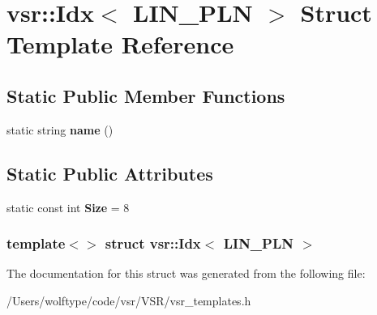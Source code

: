 \hypertarget{structvsr_1_1_idx_3_01_l_i_n___p_l_n_01_4}{\section{vsr\-:\-:Idx$<$ L\-I\-N\-\_\-\-P\-L\-N $>$ Struct Template Reference}
\label{structvsr_1_1_idx_3_01_l_i_n___p_l_n_01_4}
}
\subsection*{Static Public Member Functions}
\begin{DoxyCompactItemize}
\item 
\hypertarget{structvsr_1_1_idx_3_01_l_i_n___p_l_n_01_4_a9618b93e5e36f2b33fb8b0f38f02750c}{static string {\bfseries name} ()}\label{structvsr_1_1_idx_3_01_l_i_n___p_l_n_01_4_a9618b93e5e36f2b33fb8b0f38f02750c}

\end{DoxyCompactItemize}
\subsection*{Static Public Attributes}
\begin{DoxyCompactItemize}
\item 
\hypertarget{structvsr_1_1_idx_3_01_l_i_n___p_l_n_01_4_a685d8d26b70ce254999e17e0075b118b}{static const int {\bfseries Size} = 8}\label{structvsr_1_1_idx_3_01_l_i_n___p_l_n_01_4_a685d8d26b70ce254999e17e0075b118b}

\end{DoxyCompactItemize}
\subsubsection*{template$<$$>$ struct vsr\-::\-Idx$<$ L\-I\-N\-\_\-\-P\-L\-N $>$}



The documentation for this struct was generated from the following file\-:\begin{DoxyCompactItemize}
\item 
/\-Users/wolftype/code/vsr/\-V\-S\-R/vsr\-\_\-templates.\-h\end{DoxyCompactItemize}
